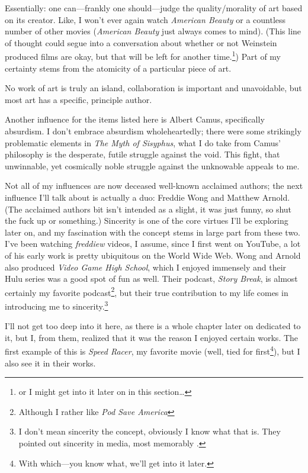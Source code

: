 \documentclass[./butidigress.tex]{subfiles}
\begin{document}
Essentially: one can---frankly one should---judge the quality/morality of art based on its creator.
Like, I won't ever again watch \textit{American Beauty} or a countless number of other movies (\textit{American Beauty} just always comes to mind).
(This line of thought could segue into a conversation about whether or not Weinstein produced films are okay, but that will be left for another time.\footnote{or I might get into it later on in this section\ldots})
Part of my certainty stems from the atomicity of a particular piece of art.

No work of art is truly an island, collaboration is important and unavoidable, but most art has a specific, principle author.

Another influence for the items listed here is Albert Camus, specifically absurdism.
I don't embrace absurdism wholeheartedly; there were some strikingly problematic elements in \textit{The Myth of Sisyphus}, what I do take from Camus' philosophy is the desperate, futile struggle against the void.
This fight, that unwinnable, yet cosmically noble struggle against the unknowable appeals to me.

Not all of my influences are now deceased well-known acclaimed authors; the next influence I'll talk about is actually a duo: Freddie Wong and Matthew Arnold.
(The acclaimed authors bit isn't intended as a slight, it was just funny, so shut the fuck up or something.)
Sincerity is one of the core virtues I'll be exploring later on, and my fascination with the concept stems in large part from these two.
I've been watching \textit{freddiew} videos, I assume, since I first went on YouTube, a lot of his early work is pretty ubiquitous on the World Wide Web.
Wong and Arnold also produced \textit{Video Game High School}, which I enjoyed immensely and their Hulu series was a good spot of fun as well.
Their podcast, \textit{Story Break}, is almost certainly my favorite podcast\footnote{Although I rather like \textit{Pod Save America}}, but their true contribution to my life comes in introducing me to sincerity.\footnote{I don't mean sincerity the concept, obviously I know what that is. They pointed out sincerity in media, most memorably .}

I'll not get too deep into it here, as there is a whole chapter later on dedicated to it, but I, from them, realized that it was the reason I enjoyed certain works.
The first example of this is \textit{Speed Racer}, my favorite movie (well, tied for first\footnote{With  which---you know what, we'll get into it later.}), but I also see it in their works.
\end{document}
